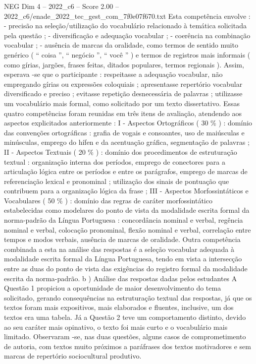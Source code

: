 \begin{textsample}{NEG Dim 4 – 2022\_c6 – Score 2.00 – 2022\_c6/enade\_2022\_tec\_gest\_com\_7f0e07f670.txt}
Esta competência envolve : - precisão na seleção/utilização do vocabulário relacionado à temática solicitada pela questão ; - diversificação e adequação vocabular ; - coerência na combinação vocabular ; - ausência de marcas da oralidade, como termos de sentido muito genérico ( “ coisa ”, “ negócio ”, “ você ” ) e termos de registros mais informais ( como gírias, jargões, frases feitas, ditados populares, termos regionais ).
Assim, esperava -se que o participante : respeitasse a adequação vocabular, não empregando gírias ou expressões coloquiais ; apresentasse repertório vocabular diversificado e preciso ; evitasse repetição desnecessária de palavras ; utilizasse um vocabulário mais formal, como solicitado por um texto dissertativo.
Essas quatro competências foram reunidas em três itens de avaliação, atendendo aos aspectos explicitados anteriormente : I - Aspectos Ortográficos ( 30 \% ) : domínio das convenções ortográficas : grafia de vogais e consoantes, uso de maiúsculas e minúsculas, emprego do hífen e da acentuação gráfica, segmentação de palavras ; II - Aspectos Textuais ( 20 \% ) : domínio dos procedimentos de estruturação textual : organização interna dos períodos, emprego de conectores para a articulação lógica entre os períodos e entre os parágrafos, emprego de marcas de referenciação lexical e pronominal ; utilização dos sinais de pontuação que contribuem para a organização lógica da frase ; III - Aspectos Morfossintáticos e Vocabulares ( 50 \% ) : domínio das regras de caráter morfossintático estabelecidas como modelares do ponto de vista da modalidade escrita formal da norma-padrão da Língua Portuguesa : concordância nominal e verbal, regência nominal e verbal, colocação pronominal, flexão nominal e verbal, correlação entre tempos e modos verbais, ausência de marcas de oralidade.
Outra competência combinada a esta na análise das respostas é a seleção vocabular adequada à modalidade escrita formal da Língua Portuguesa, tendo em vista a intersecção entre as duas do ponto de vista das exigências do registro formal da modalidade escrita da norma-padrão. b ) Análise das respostas dadas pelos estudantes A Questão 1 propiciou a oportunidade de maior desenvolvimento do tema solicitado, gerando consequências na estruturação textual das respostas, já que os textos foram mais expositivos, mais elaborados e fluentes, inclusive, um dos textos era uma tabela.
Já a Questão 2 teve um comportamento distinto, devido ao seu caráter mais opinativo, o texto foi mais curto e o vocabulário mais limitado.
Observaram -se, nas duas questões, alguns casos de comprometimento de autoria, com textos muito próximos a paráfrases dos textos motivadores e sem marcas de repertório sociocultural produtivo.

\end{textsample}
